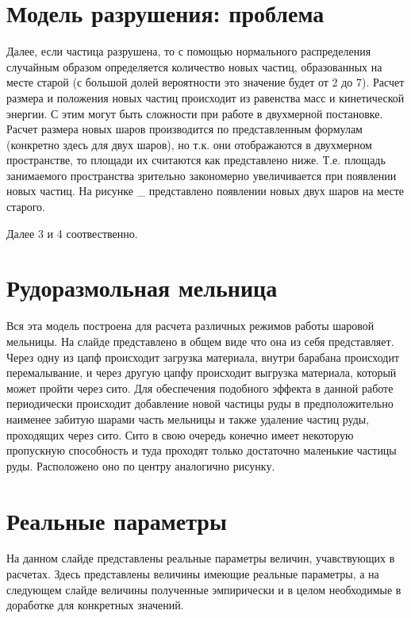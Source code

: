 \documentclass[a4paper]{article}
\begin{document}
\section{Модель разрушения: проблема}

Далее, если частица разрушена, то с помощью нормального распределения случайным образом определяется количество новых частиц, образованных на месте старой (с большой долей вероятности это значение будет от 2 до 7).
Расчет размера и положения новых частиц происходит из равенства масс и кинетической энергии.
С этим могут быть сложности при работе в двухмерной постановке.
Расчет размера новых шаров производится по представленным формулам (конкретно здесь для двух шаров), но т.к. они отображаются в двухмерном пространстве, то площади их считаются как представлено ниже.
Т.е. площадь занимаемого пространства зрительно закономерно увеличивается при появлении новых частиц.
На рисунке \_ представлено появлении новых двух шаров на месте старого.

Далее 3 и 4 соотвественно.


\section{Рудоразмольная мельница}

Вся эта модель построена для расчета различных режимов работы шаровой мельницы.
На слайде представлено в общем виде что она из себя представляет.
Через одну из цапф происходит загрузка материала, внутри барабана происходит перемалывание, и через другую цапфу происходит выгрузка материала, который может пройти через сито.
Для обеспечения подобного эффекта в данной работе периодически происходит добавление новой частицы руды в предположительно наименее забитую шарами часть мельницы и также удаление частиц руды, проходящих через сито.
Сито в свою очередь конечно имеет некоторую пропускную способность и туда проходят только достаточно маленькие частицы руды.
Расположено оно по центру аналогично рисунку.


\section{Реальные параметры}

На данном слайде представлены реальные параметры величин, учавствующих в расчетах.
Здесь представлены величины имеющие реальные параметры, а на следующем слайде величины полученные эмпирически и в целом необходимые в доработке для конкретных значений.
  
\end{document}
